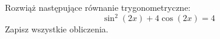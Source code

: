 Rozwiąż następujące równanie trygonometryczne:
\[
	\sin^2(2x) + 4\cos(2x) = 4
\]
Zapisz wszystkie obliczenia.